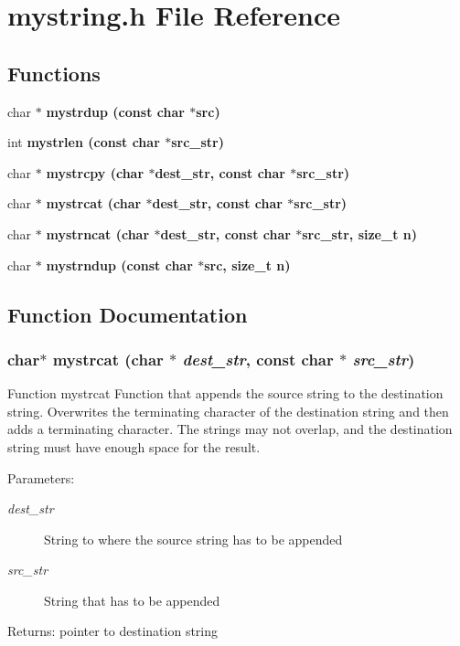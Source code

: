 \section{mystring.h File Reference}
\label{mystring_8h}
\subsection*{Functions}
\begin{CompactItemize}
\item 
char $\ast$ \bf{mystrdup} (const char $\ast$src)
\item 
int \bf{mystrlen} (const char $\ast$src\_\-str)
\item 
char $\ast$ \bf{mystrcpy} (char $\ast$dest\_\-str, const char $\ast$src\_\-str)
\item 
char $\ast$ \bf{mystrcat} (char $\ast$dest\_\-str, const char $\ast$src\_\-str)
\item 
char $\ast$ \bf{mystrncat} (char $\ast$dest\_\-str, const char $\ast$src\_\-str, size\_\-t n)
\item 
char $\ast$ \bf{mystrndup} (const char $\ast$src, size\_\-t n)
\end{CompactItemize}


\subsection{Function Documentation}
\subsubsection{\setlength{\rightskip}{0pt plus 5cm}char$\ast$ mystrcat (char $\ast$ {\em dest\_\-str}, const char $\ast$ {\em src\_\-str})}\label{mystring_8h_c60bc6a9e3a25a7291fd602b6dcda2b8}


Function mystrcat Function that appends the source string to the destination string. Overwrites the terminating character of the destination string and then adds a terminating character. The strings may not overlap, and the destination string must have enough space for the result. \begin{Desc}
\item[Parameters:]
\begin{description}
\item[{\em dest\_\-str}]String to where the source string has to be appended \item[{\em src\_\-str}]String that has to be appended \end{description}
\end{Desc}
\begin{Desc}
\item[Returns:]pointer to destination string \end{Desc}

